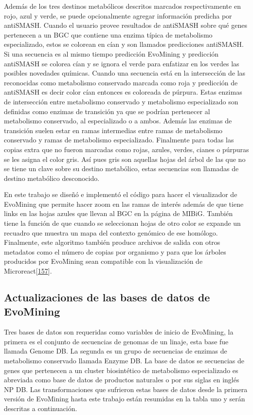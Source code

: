 \documentclass[12pt,twoside]{reedthesis}
\begin{document}
  Además de los tres destinos metabólicos descritos marcados
  respectivamente en rojo, azul y verde, se puede opcionalmente agregar
  información predicha por antiSMASH. Cuando el usuario provee resultados
  de antiSMASH sobre qué genes pertenecen a un BGC que contiene una enzima
  típica de metabolismo especializado, estos se colorean en cían y son
  llamados predicciones antiSMASH. Si una secuencia es al mismo tiempo
  predicción EvoMining y predicción antiSMASH se colorea cían y se ignora
  el verde para enfatizar en los verdes las posibles novedades químicas.
  Cuando una secuencia está en la intersección de las reconocidas como
  metabolismo conservado marcada como roja y predicción de antiSMASH es
  decir color cían entonces es coloreada de púrpura. Estas enzimas de
  intersección entre metabolismo conservado y metabolismo especializado
  son definidas como enzimas de transición ya que se podrían pertenecer al
  metabolismo conservado, al especializado o a ambos. Además las enzimas
  de transición suelen estar en ramas intermedias entre ramas de
  metabolismo conservado y ramas de metabolismo especializado. Finalmente
  para todas las copias extra que no fueron marcadas como rojas, azules,
  verdes, cianes o púrpuras se les asigna el color gris. Así pues gris son
  aquellas hojas del árbol de las que no se tiene un clave sobre su
  destino metabólico, estas secuencias son llamadas de destino metabólico
  desconocido.
  
  En este trabajo se diseñó e implementó el código para hacer el
  visualizador de EvoMining que permite hacer zoom en las ramas de interés
  además de que tiene links en las hojas azules que llevan al BGC en la
  página de MIBiG. También tiene la función de que cuando se seleccionan
  hojas de otro color se expande un recuadro que muestra un mapa del
  contexto genómico de ese homólogo. Finalmente, este algoritmo también
  produce archivos de salida con otros metadatos como el número de copias
  por organismo y para que los árboles producidos por EvoMining sean
  compatible con la visualización de
  Microreact{[}\protect\hyperlink{ref-argimon_microreact_2016}{157}{]}.
  
  \subsection{Actualizaciones de las bases de datos de
  EvoMining}\label{actualizaciones-de-las-bases-de-datos-de-evomining}
  
  Tres bases de datos son requeridas como variables de inicio de
  EvoMining, la primera es el conjunto de secuencias de genomas de un
  linaje, esta base fue llamada Genome DB. La segunda es un grupo de
  secuencias de enzimas de metabolismo conservado llamada Enzyme DB. La
  base de datos se secuencias de genes que pertenecen a un cluster
  biosintético de metabolismo especializado es abreviada como base de
  datos de productos naturales o por sus siglas en inglés NP DB. Las
  transformaciones que sufrieron estas bases de datos desde la primera
  versión de EvoMining hasta este trabajo están resumidas en la tabla uno
  y serán descritas a continuación.
  
\end{document}
